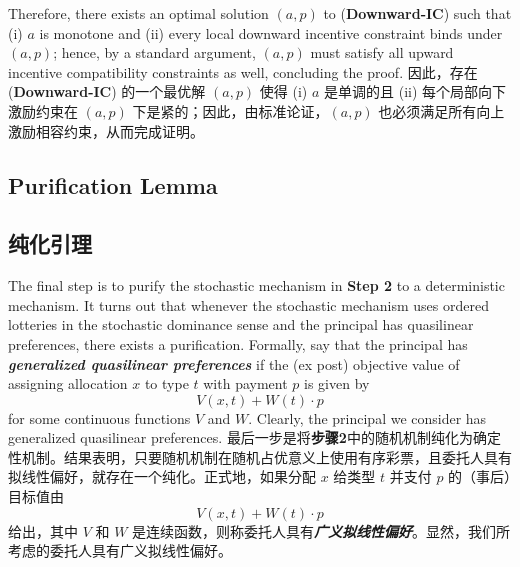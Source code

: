 \documentclass[12pt,letterpaper]{article}
\newenvironment{original}{\color{black}\noindent}{}
\newenvironment{translation}{\color{blue}\noindent}{}
\theoremstyle{plain}
\theoremstyle{definition}
\theoremstyle{remark}
\renewcommand{\1}{\mathds{1}}
\theoremstyle{definition}
\begin{document}
\begin{original}
Therefore, there exists an optimal solution  $(a, p)$ to (\textbf{Downward-IC}) such that (i) $a$ is monotone and (ii) every local downward incentive constraint binds under $(a, p)$; hence, by a standard argument, $(a, p)$ must satisfy all upward incentive compatibility constraints as well, concluding the proof.
\end{original}
\begin{translation}
因此，存在 (\textbf{Downward-IC}) 的一个最优解 $(a, p)$ 使得 (i) $a$ 是单调的且 (ii) 每个局部向下激励约束在 $(a, p)$ 下是紧的；因此，由标准论证，$(a, p)$ 也必须满足所有向上激励相容约束，从而完成证明。
\end{translation}

\begin{original}
\subsection{Purification Lemma}
\end{original}
\begin{translation}
\subsection{纯化引理}
\end{translation}

\begin{original}
The final step is to purify the stochastic mechanism in \textbf{Step 2} to a deterministic mechanism. It turns out that whenever the stochastic mechanism uses ordered lotteries in the stochastic dominance sense and the principal has quasilinear preferences, there exists a purification. Formally, say that the principal has \textit{\textbf{generalized quasilinear preferences}} if the (ex post) objective value of assigning allocation $x$ to type $t$ with payment $p$ is given by
\[V(x, t) + W(t) \cdot p\]
for some continuous functions $V$ and $W$. Clearly, the principal we consider has generalized quasilinear preferences.
\end{original}
\begin{translation}
最后一步是将\textbf{步骤2}中的随机机制纯化为确定性机制。结果表明，只要随机机制在随机占优意义上使用有序彩票，且委托人具有拟线性偏好，就存在一个纯化。正式地，如果分配 $x$ 给类型 $t$ 并支付 $p$ 的（事后）目标值由
\[V(x, t) + W(t) \cdot p\]
给出，其中 $V$ 和 $W$ 是连续函数，则称委托人具有\textit{\textbf{广义拟线性偏好}}。显然，我们所考虑的委托人具有广义拟线性偏好。
\end{translation}
\end{document}
